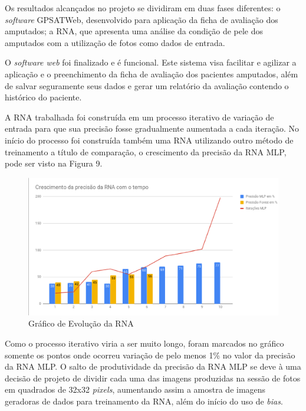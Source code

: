 Os resultados alcançados no projeto se dividiram em duas fases diferentes: o \textit{software} GPSATWeb, desenvolvido para aplicação da ficha de avaliação dos amputados; a RNA, que apresenta uma análise da condição de pele dos amputados com a utilização de fotos como dados de entrada.

O \textit{software web} foi finalizado e é funcional. Este sistema visa facilitar e agilizar a aplicação e o preenchimento da ficha de avaliação dos pacientes amputados, além de salvar seguramente seus dados e gerar um relatório da avaliação contendo o histórico do paciente.

A RNA trabalhada foi construída em um processo iterativo de variação de entrada para que sua precisão fosse gradualmente aumentada a cada iteração. No início do processo foi construída também uma RNA utilizando outro método de treinamento a título de comparação, o crescimento da precisão da RNA MLP, pode ser visto na Figura 9.

\begin{figure}[ht]
    \centering
    \label{fig09}
        \includegraphics[keepaspectratio=true, scale=0.4]{editaveis/images/grafico_rna.eps}
    \caption{Gráfico de Evolução da RNA}
\end{figure} 

 Como o processo iterativo viria a ser muito longo, foram marcados no gráfico somente os pontos onde ocorreu variação de pelo menos 1\% no valor da precisão da RNA MLP. O salto de produtividade da precisão da RNA MLP se deve à uma decisão de projeto de dividir cada uma das imagens produzidas na sessão de fotos em quadrados de 32x32 \textit{pixels}, aumentando assim a amostra de imagens geradoras de dados para treinamento da RNA, além do início do uso de \textit{bias}.


